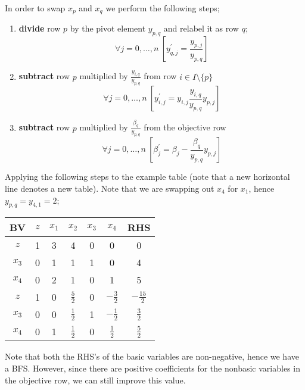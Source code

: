 \documentclass[a4paper, 12pt]{article}
\begin{document}
                In order to swap $x_p$ and $x_q$ we perform the following steps;
                \begin{enumerate}[1.]
                    \itemsep0em
                    \item \textbf{divide} row $p$ by the pivot element $y_{p, q}$ and relabel it as row $q$;
                        $$\forall j = 0, \dots, n\ \left[y^\prime_{q, j} = \frac{y_{p, j}}{y_{p, q}}\right]$$
                    \item \textbf{subtract} row $p$ multiplied by $\frac{y_{i, q}}{y_{p, q}}$ from row $i \in I \setminus \{p\}$
                        $$\forall j = 0, \dots, n\ \left[y^\prime_{i, j} = y_{i, j}  \frac{y_{i, q}}{y_{p, q}}y_{p, j}\right]$$
                    \item \textbf{subtract} row $p$ multiplied by $\frac{\beta_q}{y_{p, q}}$ from the objective row
                        $$\forall j = 0, \dots, n\ \left[\beta^\prime_j = \beta_j - \frac{\beta_q}{y_{p, q}}y_{p, j}\right]$$
                \end{enumerate}
                Applying the following steps to the example table (note that a new horizontal line denotes a new table).
                Note that we are swapping out $x_4$ for $x_1$, hence $y_{p, q} = y_{4, 1} = 2$;
                \begin{center}
                    \begin{tabular}{c|ccccc|c}
                        BV & $z$ & $x_1$ & $x_2$ & $x_3$ & $x_4$ & RHS \\
                        \hline
                        $z$ & 1 & 3 & 4 & 0 & 0 & 0 \\
                        $x_3$ & 0 & 1 & 1 & 1 & 0 & 4 \\
                        $x_4$ & 0 & 2 & 1 & 0 & 1 & 5 \\
                        \hline
                        $z$ & 1 & 0 & $\frac{5}{2}$ & 0 & $-\frac{3}{2}$ & $-\frac{15}{2}$ \\
                        $x_3$ & 0 & 0 & $\frac{1}{2}$ & 1 & $-\frac{1}{2}$ & $\frac{3}{2}$ \\
                        $x_4$ & 0 & 1 & $\frac{1}{2}$ & 0 & $\frac{1}{2}$ & $\frac{5}{2}$ \\
                    \end{tabular}
                \end{center}
                Note that both the RHS's of the basic variables are non-negative, hence we have a BFS.
                However, since there are positive coefficients for the nonbasic variables in the objective row, we can still improve this value.
                \medskip
\end{document}
